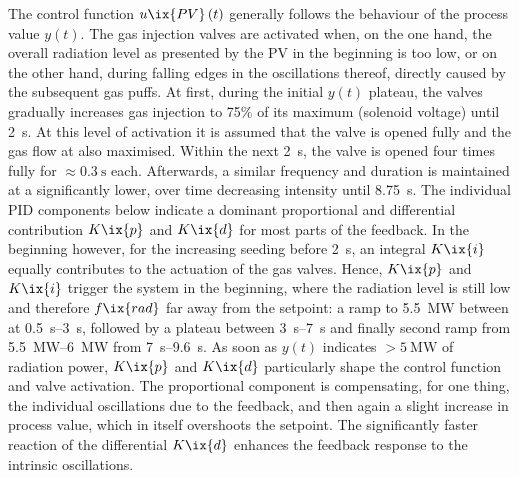             The control function $u\ix{PV}\left(t\right)$ generally follows the behaviour of the process value $y\left(t\right)$. The gas injection valves are activated when, on the one hand, the overall radiation level as presented by the PV in the beginning is too low, or on the other hand, during falling edges in the oscillations thereof, directly caused by the subsequent gas puffs. At first, during the initial $y\left(t\right)$ plateau, the valves gradually increases gas injection to 75\% of its maximum (solenoid voltage) until \SI{2}{\second}. At this level of activation it is assumed that the valve is opened fully and the gas flow at also maximised. Within the next \SI{2}{\second}, the valve is opened four times fully for $\approx\SI{0.3}{\second}$ each. Afterwards, a similar frequency and duration is maintained at a significantly lower, over time decreasing intensity until \SI{8.75}{\second}. The individual PID components below indicate a dominant proportional and differential contribution $K\ix{p}$ and $K\ix{d}$ for most parts of the feedback. In the beginning however, for the increasing seeding before \SI{2}{\second}, an integral $K\ix{i}$ equally contributes to the actuation of the gas valves. Hence, $K\ix{p}$ and $K\ix{i}$ trigger the system in the beginning, where the radiation level is still low and therefore $f\ix{rad}$ far away from the setpoint: a ramp to \SI{5.5}{\mega\watt} between at \SIrange{0.5}{3}{\second}, followed by a plateau between \SIrange{3}{7}{\second} and finally second ramp from \SIrange{5.5}{6}{\mega\watt} from \SIrange{7}{9.6}{\second}. As soon as $y\left(t\right)$ indicates $>\SI{5}{\mega\watt}$ of radiation power, $K\ix{p}$ and $K\ix{d}$ particularly shape the control function and valve activation. The proportional component is compensating, for one thing, the individual oscillations due to the feedback, and then again a slight increase in process value, which in itself overshoots the setpoint. The significantly faster reaction of the differential $K\ix{d}$ enhances the feedback response to the intrinsic oscillations.\\%
